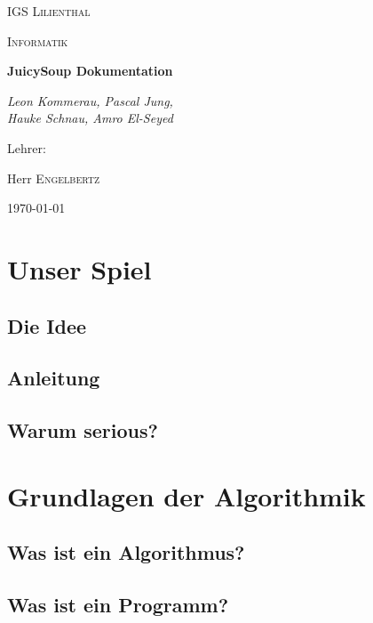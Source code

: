 \documentclass[12pt]{report}
\begin{document}
\begin{titlepage}
    \centering
    {\scshape\LARGE IGS Lilienthal \par}
	\vspace{1cm}
	{\scshape\Large Informatik \par}
	\vspace{1.5cm}
	{\huge\bfseries JuicySoup Dokumentation \par}
	\vspace{2cm}
	{\Large\itshape Leon Kommerau, Pascal Jung, \\Hauke Schnau, Amro El-Seyed \par}
	\vfill
	Lehrer:\par
	Herr \textsc{Engelbertz}

	\vfill

	{\large \today\par}
    \end{titlepage}

    \tableofcontents


    \chapter{Unser Spiel}

    \section{Die Idee}

    \section{Anleitung}

    \section{Warum serious?}


    \chapter{Grundlagen der Algorithmik}

    \section{Was ist ein Algorithmus?}

    \section{Was ist ein Programm?}
\end{document}
